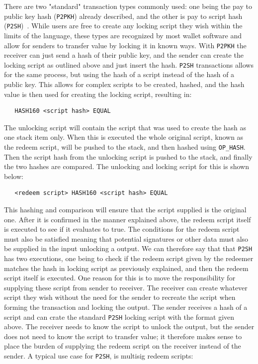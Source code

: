 There are two "standard" transaction types commonly used: one being the pay to public key hash ({\tt P2PKH}) already described, and the other is pay to script hash ({\tt P2SH})~\cite{BIP16}. While users are free to create any locking script they wish within the limits of the language, these types are recognized by most wallet software and allow for senders to transfer value by locking it in known ways. With {\tt P2PKH} the receiver can just send a hash of their public key, and the sender can create the locking script as outlined above and just insert the hash. {\tt P2SH} transactions allows for the same process, but using the hash of a script instead of the hash of a public key. This allows for complex scripts to be created, hashed, and the hash value is then used for creating the locking script, resulting in:

\begin{verbatim}
   HASH160 <script hash> EQUAL
\end{verbatim}

The unlocking script will contain the script that was used to create the hash as one stack item only. When this is executed the whole original script, known as the redeem script, will be pushed to the stack, and then hashed using {\tt OP\_HASH}. Then the script hash from the unlocking script is pushed to the stack, and finally the two hashes are compared. The unlocking and locking script for this is shown below:

\begin{verbatim}
   <redeem script> HASH160 <script hash> EQUAL
\end{verbatim}

This hashing and comparison will ensure that the script supplied is the original one. After it is confirmed in the manner explained above, the redeem script itself is executed to see if it evaluates to true. The conditions for the redeem script must also be satisfied meaning that potential signatures or other data must also be supplied in the input unlocking a output. We can therefore say that that {\tt P2SH} has two executions, one being to check if the redeem script given by the redeemer matches the hash in locking script as previously explained, and then the redeem script itself is executed.
One reason for this is to move the responsibility for supplying these script from sender to receiver. The receiver can create whatever script they wish without the need for the sender to recreate the script when forming the transaction and locking the output. The sender receives a hash of a script and can crate the standard {\tt P2SH} locking script with the format given above. The receiver needs to know the script to unlock the output, but the sender does not need to know the script to transfer value; it therefore makes sense to place the burden of supplying the redeem script on the receiver instead of the sender. A typical use case for {\tt P2SH}, is multisig redeem scripts: 


